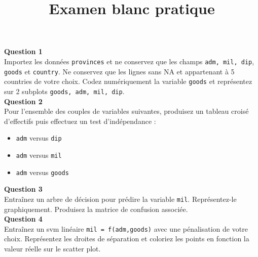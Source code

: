\documentclass[a4paper]{article}
\title{Examen blanc pratique}
\date{}
\begin{document}
\maketitle

\textbf{Question 1}\\

Importez les données \texttt{provinces} et ne conservez que les champs \texttt{adm, mil, dip}, \texttt{goods} et \texttt{country}. Ne conservez que les lignes sans NA et appartenant à 5 countries de votre choix. Codez numériquement la variable \texttt{goods} et représentez sur 2 subplots \texttt{goods, adm, mil, dip}.\\

\textbf{Question 2}\\

Pour l'ensemble des couples de variables suivantes, produisez un tableau croisé d'effectifs puis effectuez un test d'indépendance :
\begin{itemize}
	\item \texttt{adm} versus \texttt{dip}
	\item \texttt{adm} versus \texttt{mil}
	\item \texttt{adm} versus \texttt{goods}
\end{itemize}

\textbf{Question 3}\\

Entraînez un arbre de décision pour prédire la variable \texttt{mil}. Représentez-le graphiquement. Produisez la matrice de confusion associée.\\

\textbf{Question 4}\\

Entraînez un svm linéaire \texttt{mil = f(adm,goods)} avec une pénalisation de votre choix. Représentez les droites de séparation et coloriez les points en fonction la valeur réelle sur le scatter plot.
\end{document}
